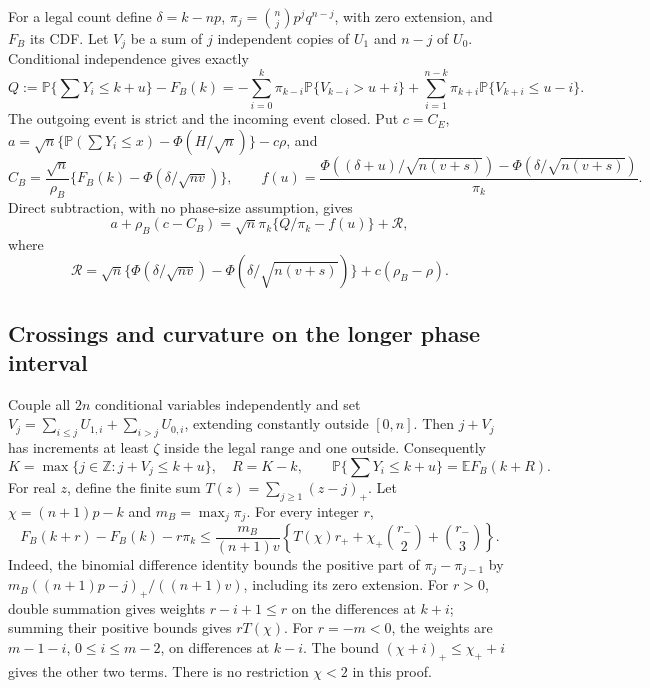 For a legal count define $\delta=k-np$, $\pi_j=\binom njp^jq^{n-j}$,
with zero extension, and $F_B$ its CDF. Let $V_j$ be a sum of $j$ independent
copies of $U_1$ and $n-j$ of $U_0$. Conditional independence gives exactly
\[
 Q:=\mathbb P\Big\{\sum Y_i\le k+u\Big\}-F_B(k)
 =-\sum_{i=0}^k\pi_{k-i}\mathbb P\{V_{k-i}>u+i\}
   +\sum_{i=1}^{n-k}\pi_{k+i}\mathbb P\{V_{k+i}\le u-i\}.
\]
The outgoing event is strict and the incoming event closed. Put $c=C_E$,
$a=\sqrt n\{\mathbb P(\sum Y_i\le x)-\Phi(H/\sqrt n)\}-c\rho$, and
\[
 C_B=\frac{\sqrt n}{\rho_B}\{F_B(k)-\Phi(\delta/\sqrt{nv})\},
 \qquad
 f(u)=\frac{\Phi((\delta+u)/\sqrt{n(v+s)})-
                  \Phi(\delta/\sqrt{n(v+s)})}{\pi_k}.
\]
Direct subtraction, with no phase-size assumption, gives
\begin{equation}\label{v10:count:master}
 a+\rho_B(c-C_B)=\sqrt n\pi_k\{Q/\pi_k-f(u)\}+\mathcal R,
\end{equation}
where
\[
 \mathcal R=\sqrt n\{\Phi(\delta/\sqrt{nv})-
                   \Phi(\delta/\sqrt{n(v+s)})\}+c(\rho_B-\rho).
\]

\subsection{Crossings and curvature on the longer phase interval}
Couple all $2n$ conditional variables independently and set
$V_j=\sum_{i\le j}U_{1,i}+\sum_{i>j}U_{0,i}$, extending constantly
outside $[0,n]$. Then $j+V_j$ has increments at least $\zeta$ inside the
legal range and one outside. Consequently
\[
 K=\max\{j\in\mathbb Z:j+V_j\le k+u\},\quad R=K-k,
 \qquad \mathbb P\Big\{\sum Y_i\le k+u\Big\}=\mathbb EF_B(k+R).
\]
For real $z$, define the finite sum $T(z)=\sum_{j\ge1}(z-j)_+$.
Let $\chi=(n+1)p-k$ and $m_B=\max_j\pi_j$. For every integer $r$,
\begin{equation}\label{v10:count:curvature}
 F_B(k+r)-F_B(k)-r\pi_k
 \le\frac{m_B}{(n+1)v}
 \left\{T(\chi)r_++\chi_+\binom{r_-}{2}+\binom{r_-}{3}\right\}.
\end{equation}
Indeed, the binomial difference identity bounds the positive part of
$\pi_j-\pi_{j-1}$ by $m_B((n+1)p-j)_+/((n+1)v)$, including its zero
extension. For $r>0$, double summation gives weights $r-i+1\le r$ on
the differences at $k+i$; summing their positive bounds gives $rT(\chi)$.
For $r=-m<0$, the weights are $m-1-i$, $0\le i\le m-2$, on differences
at $k-i$. The bound $(\chi+i)_+\le\chi_++i$ gives the other two terms.
There is no restriction $\chi<2$ in this proof.

